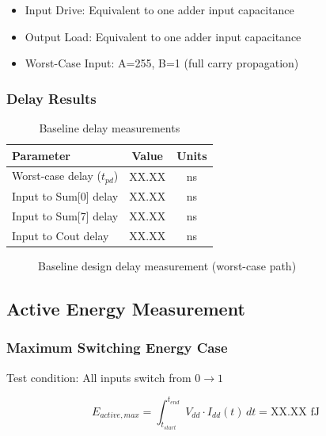 \documentclass[12pt,letterpaper]{article}
\begin{document}
\begin{itemize}
    \item Input Drive: Equivalent to one adder input capacitance
    \item Output Load: Equivalent to one adder input capacitance
    \item Worst-Case Input: A=255, B=1 (full carry propagation)
\end{itemize}

\subsubsection{Delay Results}

\begin{table}[H]
\centering
\caption{Baseline delay measurements}
\label{tab:baseline_delay}
\begin{tabular}{@{}lcc@{}}
\toprule
\textbf{Parameter} & \textbf{Value} & \textbf{Units} \\
\midrule
Worst-case delay ($t_{pd}$) & XX.XX & ns \\
Input to Sum[0] delay & XX.XX & ns \\
Input to Sum[7] delay & XX.XX & ns \\
Input to Cout delay & XX.XX & ns \\
\bottomrule
\end{tabular}
\end{table}

\begin{figure}[H]
    \centering
    \caption{Baseline design delay measurement (worst-case path)}
    \label{fig:baseline_delay}
\end{figure}

\subsection{Active Energy Measurement}

\subsubsection{Maximum Switching Energy Case}

Test condition: All inputs switch from $0 \rightarrow 1$

\begin{equation}
E_{active,max} = \int_{t_{start}}^{t_{end}} V_{dd} \cdot I_{dd}(t) \, dt = \text{XX.XX fJ}
\end{equation}
\end{document}
